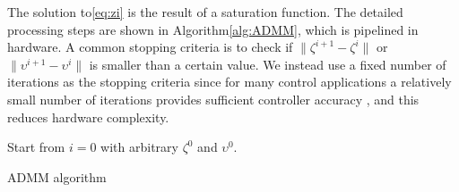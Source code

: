 


The solution to\cref{eq:zi} is the result of a saturation function. The detailed processing steps are shown in Algorithm\cref{alg:ADMM}, which is pipelined in hardware. A common stopping criteria is to check if $\lVert \zeta^{i+1}-\zeta^i\rVert$ or $\lVert \upsilon^{i+1}-\upsilon^i\rVert$ is smaller than a certain value. We instead use a fixed number of iterations as the stopping criteria since for many control applications a relatively small number of iterations provides sufficient controller accuracy \cite{6422363}, and this reduces hardware complexity.

\begin{algorithm}
Start from $i=0$ with arbitrary $\zeta^0$ and $\upsilon^0$.
\caption{ADMM algorithm}\label{alg:ADMM}
\end{algorithm}

